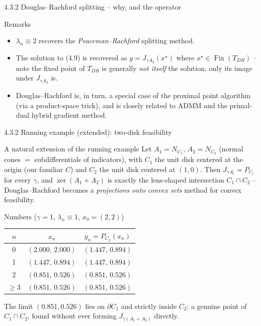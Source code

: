 \documentclass[aspectratio=169,10pt]{beamer}
\newcommand{\Fix}{\operatorname{Fix}}
\newcommand{\zer}{\operatorname{zer}}
\begin{document}
\begin{frame}[allowframebreaks]{4.3.2 Douglas--Rachford splitting -- why, and the operator}
  \framebreak

  \begin{block}{Remarks}
    \begin{itemize}
      \item $\lambda_n\equiv 2$ recovers the \emph{Peaceman--Rachford} splitting method.
      \item The solution to (4.9) is recovered as $y=J_{\gamma A_2}(x^\star)$ where $x^\star\in\Fix(T_{DR})$ -- note the fixed point of $T_{DR}$ is generally \emph{not itself} the solution, only its image under $J_{\gamma A_2}$ is.
      \item Douglas--Rachford is, in turn, a special case of the proximal point algorithm (via a product-space trick), and is closely related to ADMM and the primal-dual hybrid gradient method.
    \end{itemize}
  \end{block}
\end{frame}

\begin{frame}{4.3.2 Running example (extended): two-disk feasibility}
  \begin{block}{A natural extension of the running example}
    Let $A_1=N_{C_1}$, $A_2=N_{C_2}$ (normal cones $=$ subdifferentials of indicators), with $C_1$ the unit disk centered at the origin (our familiar $C$) and $C_2$ the unit disk centered at $(1,0)$. Then $J_{\gamma A_i}=P_{C_i}$ for every $\gamma$, and $\zer(A_1+A_2)$ is exactly the lens-shaped intersection $C_1\cap C_2$ -- Douglas--Rachford becomes a \emph{projections onto convex sets} method for convex feasibility.
  \end{block}
  \begin{block}{Numbers ($\gamma=1$, $\lambda_n\equiv1$, $x_0=(2,2)$)}
    \centering\small
    \begin{tabular}{c c c}
      \toprule
      $n$ & $x_n$ & $y_n=P_{C_2}(x_n)$ \\
      \midrule
      0 & $(2.000,\,2.000)$ & $(1.447,\,0.894)$ \\
      1 & $(1.447,\,0.894)$ & $(1.447,\,0.894)$ \\
      2 & $(0.851,\,0.526)$ & $(0.851,\,0.526)$ \\
      $\ge3$ & $(0.851,\,0.526)$ & $(0.851,\,0.526)$ \\
      \bottomrule
    \end{tabular}
  \end{block}
  The limit $(0.851,0.526)$ lies on $\partial C_1$ and strictly inside $C_2$: a genuine point of $C_1\cap C_2$, found without ever forming $J_{\gamma(A_1+A_2)}$ directly.
\end{frame}
\end{document}
